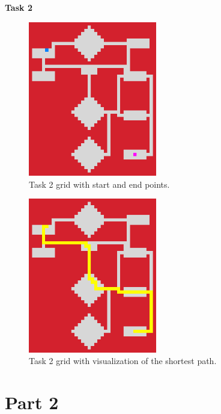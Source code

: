 \documentclass{article}
\begin{document}
    \newpage

    \textbf{Task 2}

    \begin{figure}[H]
        \centering
        \includegraphics[width=0.5\textwidth]{Images/p1t2_start.png}
        \caption[Task 1 startgrid]{Task 2 grid with start and end points.}
        \label{fig:Task 2 startgrid}
    \end{figure}

    \begin{figure}[H]
        \centering
        \includegraphics[width=0.5\textwidth]{Images/p1t2_finish.png}
        \caption[Task 1 endgrid]{Task 2 grid with visualization of the shortest path.}
        \label{fig:Task 2 endgrid}
    \end{figure}

    \newpage

    \section*{Part 2}
\end{document}
